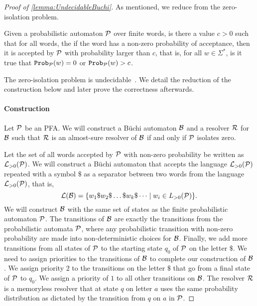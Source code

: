 \begin{proof}[Proof of \cref{lemma:UndecidableBuchi}]
As mentioned, we reduce from the zero-isolation problem.

\begin{question} 
    Given a probabilistic automaton  $\mathcal{P}$ over finite words, is there a value $c>0$ such that for all words, the if the word has a non-zero probability of acceptance, then it is accepted by $\mathcal{P}$ with probability larger than $c$, that is, for all $w\in\Sigma^*$, is it true that $\mathtt{Prob}_{\mathcal{P}}(w) =0 $ or $\mathtt{Prob}_{\mathcal{P}}(w) > c$.
\end{question}   
The zero-isolation problem is undecidable~\cite[Theorem 4]{GO10}. 
We detail the reduction of the construction below and later prove the correctness afterwards. 
\paragraph*{Construction}
Let $\mathcal{P}$ be an PFA. We will construct a B\"uchi automaton $\mathcal{B}$ and a resolver $\mathcal{R}$ for $\mathcal{B}$ such that $\mathcal{R}$ is an almost-sure resolver of $\mathcal{B}$ if and only if $\mathcal{P}$ isolates zero. 

Let the set of all words accepted by $\mathcal{P}$ with non-zero probability be written as $\mathcal{L}_{>0}(\mathcal{P})$. We will construct a B\"uchi automaton that accepts the language $\mathcal{L}_{>0}(\mathcal{P})$ repeated with a symbol $\$$ as a separator between  two words from the language $\mathcal{L}_{>0}(\mathcal{P})$, that is,  $$\mathcal{L}(\mathcal{B}) = \{w_1\$w_2\$\dots \$w_k\$\dots \mid w_i\in L_{>0}(\mathcal{P})\}.$$
We will construct $\mathcal{B}$ with the same set of states as the finite probabilistic automaton $\mathcal{P}$. 
The transitions of $\mathcal{B}$ are exactly the transitions from the probabilistic automata $\mathcal{P}$, where any probabilistic transition with non-zero probability are made into non-deterministic choices for $\mathcal{B}$. 
Finally, we add more transitions from all states of $\mathcal{P}$ to the starting state $q_0$ of $\mathcal{P}$ on the letter $\$$.
We need to assign priorities to the transitions of $\mathcal{B}$ to complete our construction of $\mathcal{B}$. We assign priority $2$ to the transitions on the letter $\$$ that go from a final state of $\mathcal{P}$ to $q_0$. We assign a priority of $1$ to all other transitions on $\mathcal{B}$.
The resolver $\mathcal{R}$ is a memoryless resolver that at state $q$ on letter $a$ uses the same probability distribution as dictated by the transition from $q$ on $a$ in $\mathcal{P}$.


\end{proof}
